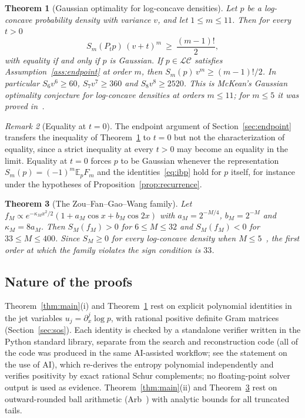 \documentclass[11pt]{article}
\newtheorem{theorem}{Theorem}[section]
\theoremstyle{definition}
\theoremstyle{remark}
\newtheorem{remark}[theorem]{Remark}
\newcommand{\E}{\mathbb E}
\begin{document}
\begin{theorem}[Gaussian optimality for log-concave densities]\label{thm:sharp}
Let $p$ be a log-concave probability density with variance $v$, and let
$1\le m\le11$. Then for every $t>0$
\[
 S_m(P_tp)\,(v+t)^m\ \ge\ \frac{(m-1)!}{2},
\]
with equality if and only if $p$ is Gaussian. If $p\in\mathcal{LC}$ satisfies
Assumption~\ref{ass:endpoint} at order $m$, then $S_m(p)\,v^m\ge(m-1)!/2$. In
particular $S_6v^6\ge60$, $S_7v^7\ge360$ and $S_8v^8\ge2520$. This is McKean's
Gaussian optimality conjecture for log-concave densities at orders $m\le11$; for
$m\le5$ it was proved in~\cite{ZAG18}.
\end{theorem}

\begin{remark}[Equality at $t=0$]\label{rem:equality-endpoint}
The endpoint argument of Section~\ref{sec:endpoint} transfers the inequality of
Theorem~\ref{thm:sharp} to $t=0$ but not the characterization of equality, since a
strict inequality at every $t>0$ may become an equality in the limit. Equality at
$t=0$ forces $p$ to be Gaussian whenever the representation $S_m(p)=(-1)^m\E_pF_m$
and the identities~\eqref{eq:ibp} hold for $p$ itself, for instance under the
hypotheses of Proposition~\ref{prop:recurrence}.
\end{remark}

\begin{theorem}[The Zou--Fan--Gao--Wang family]\label{thm:zou}
Let $f_M\propto e^{-\kappa_Mx^2/2}(1+a_M\cos x+b_M\cos2x)$ with $a_M=2^{-M/4}$,
$b_M=2^{-M}$ and $\kappa_M=8a_M$. Then $S_M(f_M)>0$ for $6\le M\le32$ and
$S_M(f_M)<0$ for $33\le M\le400$. Since $S_M\ge0$ for every log-concave density when
$M\le5$~\cite{ZAG18,Wang24}, the first order at which the family violates the sign
condition is $33$.
\end{theorem}

\subsection{Nature of the proofs}
Theorem~\ref{thm:main}(i) and Theorem~\ref{thm:sharp} rest on explicit polynomial
identities in the jet variables $u_j=\partial_x^j\log p$, with rational positive
definite Gram matrices (Section~\ref{sec:sos}). Each identity is checked by a
standalone verifier written in the Python standard library, separate from the search
and reconstruction code (all of the code was produced in the same AI-assisted
workflow; see the statement on the use of AI), which re-derives the
entropy polynomial independently and verifies positivity by exact rational Schur
complements; no floating-point solver output is used as evidence. Theorem~\ref{thm:main}(ii)
and Theorem~\ref{thm:zou} rest on outward-rounded ball arithmetic
(Arb~\cite{Johansson17}) with analytic bounds for all truncated tails.
\end{document}
